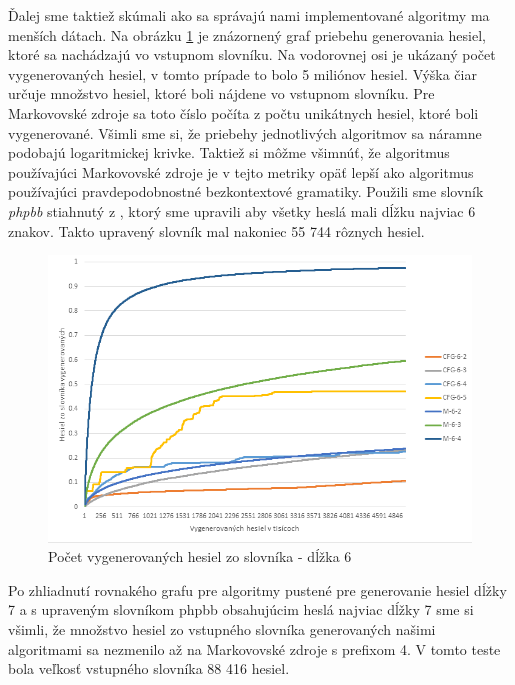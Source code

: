 Ďalej sme taktiež skúmali ako sa správajú nami implementované algoritmy ma menších dátach. Na obrázku \ref{fig:Acc6} je znázornený graf priebehu generovania hesiel, ktoré sa nachádzajú vo vstupnom slovníku. Na vodorovnej osi je ukázaný počet vygenerovaných hesiel, v tomto prípade to bolo 5 miliónov hesiel. Výška čiar určuje množstvo hesiel, ktoré boli nájdene vo vstupnom slovníku. Pre Markovovské zdroje sa toto číslo počíta z počtu unikátnych hesiel, ktoré boli vygenerované. Všimli sme si, že priebehy jednotlivých algoritmov sa náramne podobajú logaritmickej krivke. Taktiež si môžme všimnúť, že algoritmus používajúci Markovovské zdroje je v tejto metriky opäť lepší ako algoritmus používajúci pravdepodobnostné bezkontextové gramatiky. Použili sme slovník \emph{phpbb} stiahnutý z \cite{dictionaries}, ktorý sme upravili aby všetky heslá mali dĺžku najviac 6 znakov. Takto upravený slovník mal nakoniec 55 744 rôznych hesiel.

\begin{figure}[ht]
    \centering
    \includegraphics[width=1\textwidth]{sameDictAcc6}
    \caption{Počet vygenerovaných hesiel zo slovníka - dĺžka 6}
    \label{fig:Acc6}
\end{figure}

Po zhliadnutí rovnakého grafu pre algoritmy pustené pre generovanie hesiel dĺžky 7 a s upraveným slovníkom phpbb obsahujúcim heslá najviac dĺžky 7 sme si všimli, že množstvo hesiel zo vstupného slovníka generovaných našimi algoritmami sa nezmenilo až na Markovovské zdroje s prefixom 4. V tomto teste bola veľkosť vstupného slovníka 88 416 hesiel.

